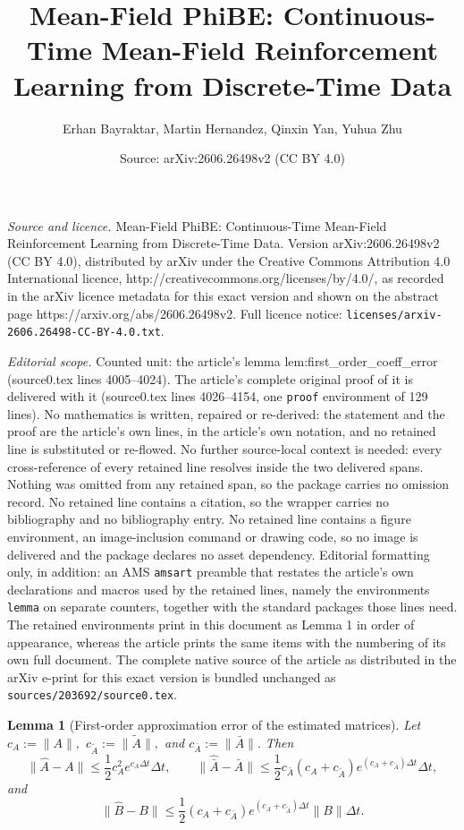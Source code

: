 \documentclass[10pt,a4paper]{amsart}
\title{Mean-Field PhiBE: Continuous-Time Mean-Field Reinforcement Learning from Discrete-Time Data}
\author{Erhan Bayraktar, Martin Hernandez, Qinxin Yan, Yuhua Zhu}
\date{Source: arXiv:2606.26498v2 (CC BY 4.0)}
\newtheorem{lemma}{Lemma}
\begin{document}
\maketitle

\noindent\emph{Source and licence.} Mean-Field PhiBE: Continuous-Time Mean-Field Reinforcement Learning from Discrete-Time Data. Version arXiv:2606.26498v2 (CC BY 4.0), distributed by arXiv under the Creative Commons Attribution 4.0 International licence, http://creativecommons.org/licenses/by/4.0/, as recorded in the arXiv licence metadata for this exact version and shown on the abstract page https://arxiv.org/abs/2606.26498v2. Full licence notice: \texttt{licenses/arxiv-2606.26498-CC-BY-4.0.txt}.\par\smallskip

\noindent\textit{Editorial scope.} Counted unit: the article's lemma lem:first\_order\_coeff\_error (source0.tex lines 4005--4024). The article's complete original proof of it is delivered with it (source0.tex lines 4026--4154, one \texttt{proof} environment of 129 lines). No mathematics is written, repaired or re-derived: the statement and the proof are the article's own lines, in the article's own notation, and no retained line is substituted or re-flowed.  No further source-local context is needed: every cross-reference of every retained line resolves inside the two delivered spans.  Nothing was omitted from any retained span, so the package carries no omission record.  No retained line contains a citation, so the wrapper carries no bibliography and no bibliography entry.  No retained line contains a figure environment, an image-inclusion command or drawing code, so no image is delivered and the package declares no asset dependency.  Editorial formatting only, in addition: an AMS \texttt{amsart} preamble that restates the article's own declarations and macros used by the retained lines, namely the environments \texttt{lemma} on separate counters, together with the standard packages those lines need.  The retained environments print in this document as Lemma 1 in order of appearance, whereas the article prints the same items with the numbering of its own full document.  The complete native source of the article as distributed in the arXiv e-print for this exact version is bundled unchanged as \texttt{sources/203692/source0.tex}.
\begin{lemma}[First-order approximation error of the estimated matrices]
\label{lem:first_order_coeff_error}
Let $c_A:=\|A\|,$ $c_{\tilde A}:=\|\tilde A\|,$ and $c_{\bar A}:=\|\bar A\|.$ Then
\[
    \|\hat A-A\|
    \le
    \frac12 c_A^2 e^{c_A\Delta t}\Delta t,\qquad 
    \|\hat{\bar A}-\bar A\|
    \le
    \frac12 c_{\bar A}(c_A+c_{\tilde A})
    e^{(c_A+c_{\tilde A})\Delta t}\Delta t,
\]
and
\[
    \|\hat B-B\|
    \le
    \frac12
    (c_A+c_{\bar A})e^{(c_A+c_{\tilde A})\Delta t}\|B\|\Delta t.
\]
\end{lemma}
\end{document}
